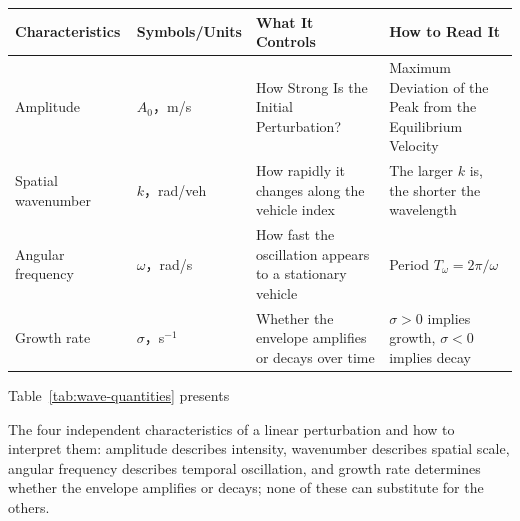 \documentclass[11pt,a4paper,openany]{book}
\numberwithin{equation}{chapter}
\numberwithin{figure}{chapter}
\numberwithin{table}{chapter}
\newcommand{\tabletext}[2]{%
  \par\smallskip\noindent
  Table~\ref{#1} presents #2
\par\smallskip
}
\begin{document}
\begin{center}
\small
{}
\label{tab:wave-quantities}
\begin{tabular}{p{2.4cm}p{2.4cm}p{4.4cm}p{4.5cm}}
\toprule
\textbf{Characteristics} & \textbf{Symbols/Units} & \textbf{What It Controls} & \textbf{How to Read It} \\
\midrule







Amplitude




& $A_0$，m/s &




 How Strong Is the Initial Perturbation?




&




 Maximum Deviation of the Peak from the Equilibrium Velocity




\\[3pt]
Spatial wavenumber

& $k$，rad/veh &

How rapidly it changes along the vehicle index

&

The larger $k$ is, the shorter the wavelength
\\[3pt]
Angular frequency

& $\omega$，rad/s &

How fast the oscillation appears to a stationary vehicle

&

Period $T_\omega=2\pi/\omega$
\\[3pt]
Growth rate

& $\sigma$，s$^{-1}$ &

Whether the envelope amplifies or decays over time

&

$\sigma>0$ implies growth, $\sigma<0$ implies decay
\\
\bottomrule
\end{tabular}
\end{center}
\tabletext{tab:wave-quantities}{

The four independent characteristics of a linear perturbation and how to interpret them: amplitude describes intensity, wavenumber describes spatial scale, angular frequency describes temporal oscillation, and growth rate determines whether the envelope amplifies or decays; none of these can substitute for the others.
}
\end{document}
